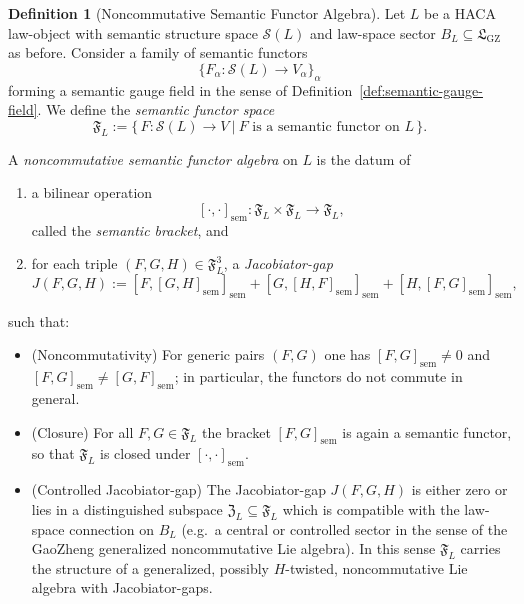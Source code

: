\documentclass[11pt]{book}
\theoremstyle{plain}
\theoremstyle{definition}
\newtheorem{definition}[theorem]{Definition}
\theoremstyle{remark}
\newcommand{\GZLS}{\ensuremath{\mathfrak{L}_{\mathrm{GZ}}}}       \newcommand{\GZLT}{\ensuremath{M_{!w}}}                           \newcommand{\GZLOC}{\ensuremath{A_M}}                             \newcommand{\GZLC}{\ensuremath{\omega_{\mathrm{law}}}}            \newcommand{\GZLCurv}{\ensuremath{\mathcal{F}_{\mathrm{law}}}}
\begin{document}
\begin{definition}[Noncommutative Semantic Functor Algebra]
\label{def:noncommutative-semantic-functor-algebra}
Let $L$ be a HACA law-object with semantic structure space
$\mathcal{S}(L)$ and law-space sector $B_L\subseteq\GZLS$ as before.
Consider a family of semantic functors
\[
  \{F_\alpha:\mathcal{S}(L)\to V_\alpha\}_\alpha
\]
forming a semantic gauge field in the sense of
Definition~\ref{def:semantic-gauge-field}. We define the
\emph{semantic functor space}
\[
  \mathfrak{F}_L
  :=
  \bigl\{\, F:\mathcal{S}(L)\to V \ \big|\ F
  \text{ is a semantic functor on }L \,\bigr\}.
\]

A \emph{noncommutative semantic functor algebra} on $L$ is the datum of
\begin{enumerate}
  \item a bilinear operation
        \[
          [\cdot,\cdot]_{\mathrm{sem}} :
          \mathfrak{F}_L\times\mathfrak{F}_L\longrightarrow\mathfrak{F}_L,
        \]
        called the \emph{semantic bracket}, and
  \item for each triple $(F,G,H)\in\mathfrak{F}_L^3$, a
        \emph{Jacobiator-gap}
        \[
          J(F,G,H)
          :=
          [F,[G,H]_{\mathrm{sem}}]_{\mathrm{sem}}
          + [G,[H,F]_{\mathrm{sem}}]_{\mathrm{sem}}
          + [H,[F,G]_{\mathrm{sem}}]_{\mathrm{sem}},
        \]
\end{enumerate}
such that:
\begin{itemize}
  \item (Noncommutativity) For generic pairs $(F,G)$ one has
        \(
          [F,G]_{\mathrm{sem}}\neq 0
        \)
        and \\$[F,G]_{\mathrm{sem}}\neq [G,F]_{\mathrm{sem}}$; in
        particular, the functors do not commute in general.
  \item (Closure) For all $F,G\in\mathfrak{F}_L$ the bracket
        $[F,G]_{\mathrm{sem}}$ is again a semantic functor, so that
        $\mathfrak{F}_L$ is closed under $[\cdot,\cdot]_{\mathrm{sem}}$.
  \item (Controlled Jacobiator-gap) The Jacobiator-gap $J(F,G,H)$ is
        either zero or lies in a distinguished subspace
        $\mathfrak{Z}_L\subseteq\mathfrak{F}_L$ which is compatible with
        the law-space connection on $B_L$ (e.g.\ a central or controlled
        sector in the sense of the GaoZheng generalized noncommutative
        Lie algebra). In this sense $\mathfrak{F}_L$ carries the
        structure of a generalized, possibly $H$-twisted, noncommutative
        Lie algebra with Jacobiator-gaps.
\end{itemize}

\end{definition}
\end{document}
